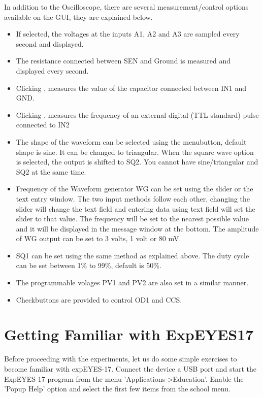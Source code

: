 \documentclass[a4paper,12pt,english]{sphinxmanual}
\begin{document}
In addition to the Oscilloscope, there are several measurement/control
options available on the GUI, they are explained below.
\begin{itemize}
\item {} 
If selected, the voltages at the inputs A1, A2 and A3 are sampled
every second and displayed.

\item {} 
The resistance connected between SEN and Ground is measured and
displayed every second.

\item {} 
Clicking , measures the value of the capacitor
connected between IN1 and GND.

\item {} 
Clicking , measures the frequency of an external
digital (TTL standard) pulse connected to IN2

\item {} 
The shape of the waveform can be selected using the menubutton,
default shape is sine. It can be changed to triangular. When the
square wave option is selected, the output is shifted to SQ2. You
cannot have sine/triangular and SQ2 at the same time.

\item {} 
Frequency of the Waveform generator WG can be set using the slider or
the text entry window. The two input methods follow each other,
changing the slider will change the text field and entering data
using text field will set the slider to that value. The frequency
will be set to the nearest possible value and it will be displayed in
the message window at the bottom. The amplitude of WG output can be
set to 3 volts, 1 volt or 80 mV.

\item {} 
SQ1 can be set using the same method as explained above. The duty
cycle can be set between 1\% to 99\%, default is 50\%.

\item {} 
The programmable volages PV1 and PV2 are also set in a similar
manner.

\item {} 
Checkbuttons are provided to control OD1 and CCS.

\end{itemize}


\chapter{Getting Familiar with ExpEYES17}
\label{\detokenize{1.5:getting-familiar-with-expeyes17}}\label{\detokenize{1.5::doc}}
Before proceeding with the experiments, let us do some simple exercises
to become familiar with expEYES-17. Connect the device a USB port and
start the ExpEYES-17 program from the menu ’Applications-\textgreater{}Education’.
Enable the ’Popup Help’ option and select the first few items from the
school menu.
\end{document}
